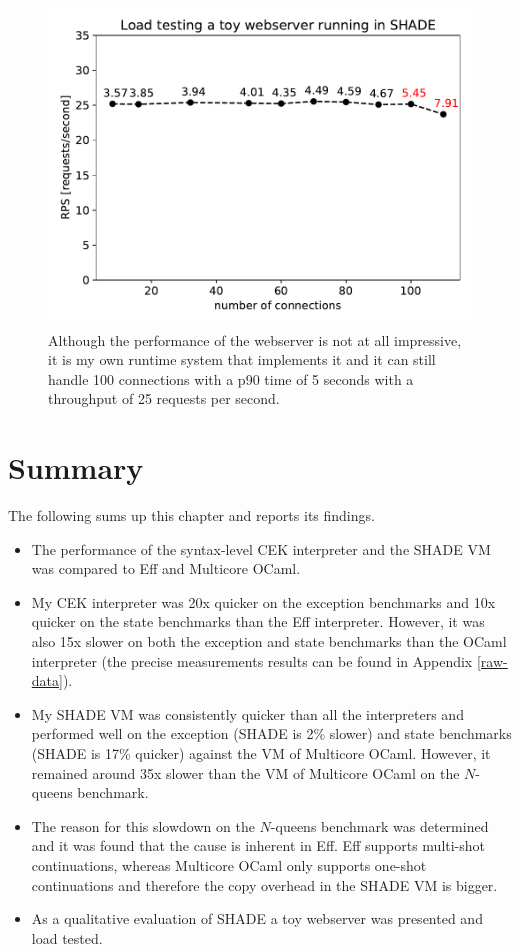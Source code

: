 \documentclass[class=article, crop=false]{standalone}
\begin{document}
\begin{figure}[htb]
    \centering
    \captionsetup{width=.9\linewidth}
    \includegraphics[height=.3\textheight]{eval_plots/webserver.pdf}
    \caption[Load testing a toy webserver]{\small Although the performance of the webserver is not at all impressive,
    it is my own runtime system that implements it and it can still handle 100
    connections with a p90 time of 5 seconds with a throughput of 25 requests
    per second.}
    \label{fig:hello-online-world}
\end{figure}

\section{Summary}
The following sums up this chapter and reports its findings.
\begin{itemize}
\item The performance of the syntax-level CEK interpreter and the SHADE VM was
compared to Eff and Multicore OCaml.
\item My CEK interpreter was 20x quicker on the exception benchmarks and 10x
quicker on the state benchmarks than the Eff interpreter. However, it was also
15x slower on both the exception and state benchmarks than the OCaml interpreter
(the precise measurements results can be found in Appendix \autoref{raw-data}).
\item My SHADE VM was consistently quicker than all the interpreters and
performed well on the exception (SHADE is 2\% slower) and state benchmarks
(SHADE is 17\% quicker) against the VM of Multicore OCaml. However,
it remained around 35x slower than the VM of Multicore OCaml on the $N$-queens
benchmark.
\item The reason for this slowdown on the $N$-queens benchmark
was determined and it was found that the cause is inherent in Eff. Eff supports
multi-shot continuations, whereas Multicore OCaml only supports one-shot
continuations and therefore the copy overhead in the SHADE VM is bigger.
\item As a qualitative evaluation of SHADE a toy webserver was presented and
load tested.
\end{itemize}
\end{document}
